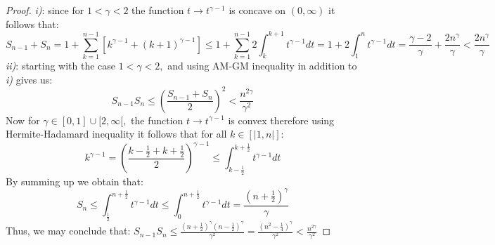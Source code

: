 \documentclass[10pt,a4paper]{amsart}
\begin{document}
\begin{proof} 
\textit{ i)}: since for $1 < \gamma < 2$ the function $t \to t^{\gamma-1}$ is concave on $(0,\infty)$ it follows that:
$$ S_{n-1}+S_{n} = 1+ \sum_{k=1}^{n-1} \left[ k^{\gamma-1} + (k+1)^{\gamma-1} \right]
\leq 1+ \sum_{k=1}^{n-1} 2 \int_{k}^{k+1} t^{\gamma-1} dt = 1+ 2 \int_{1}^{n} t^{\gamma-1} dt = \frac{\gamma-2}{\gamma} + \frac{2 n^{\gamma}}{\gamma} <  \frac{2 n^{\gamma}}{\gamma}  $$
\textit{ ii)}: starting with the case $1 < \gamma < 2,$ and using AM-GM inequality in addition to \textit{i)} gives us:
$$S_{n-1} S_{n} \leq  \left( \frac{S_{n-1}+S_{n}}{2} \right )^2  <  \frac{n^{2 \gamma}}{\gamma^2}$$
Now for $\gamma \in [0,1] \cup [2,\infty[,$ the function $t \to t^{\gamma-1}$ is convex therefore using Hermite-Hadamard inequality it follows that for all $k \in [|1,n|]:$
$$
k^{\gamma-1} = \left( \frac{k-\frac{1}{2}+  k+\frac{1}{2}}{2} \right)^{\gamma-1} \leq  \int_{k- \frac{1}{2}}^{k+ \frac{1}{2}} t^{\gamma-1} dt $$
By summing up we obtain that:
$$ S_{n} \leq \int_{\frac{1}{2}}^{n+\frac{1}{2}} t^{\gamma-1} dt \leq   \int_{0}^{n+\frac{1}{2}} t^{\gamma-1} dt  = \frac{(n+\frac{1}{2})^{\gamma}}{\gamma} $$
Thus, we may conclude that:
$ \displaystyle S_{n-1} S_{n} \leq  \frac{(n+\frac{1}{2} )^{\gamma} (n-\frac{1}{2})^{\gamma}}{\gamma^2} = \frac{(n^2-\frac{1}{4})^{\gamma}}{\gamma^2} < \frac{n^{2 \gamma}}{\gamma^2}$


\end{proof}
\end{document}
